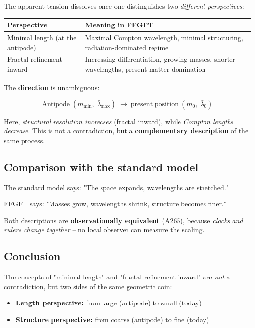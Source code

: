 The apparent tension dissolves once one distinguishes two
\emph{different perspectives}:

\begin{center}
	\small
	\begin{tabular}{p{}p{}}
		\toprule
		\textbf{Perspective} & \textbf{Meaning in FFGFT} \\
		\midrule
		Minimal length (at the antipode) & 
		Maximal Compton wavelength, minimal structuring,
		radiation-dominated regime \\
		Fractal refinement inward & 
		Increasing differentiation, growing masses,
		shorter wavelengths, present matter domination \\
		\bottomrule
	\end{tabular}
\end{center}

The \textbf{direction} is unambiguous:

\[
\text{Antipode} \;(m_\text{min},\; \bar\lambda_\text{max})
\;\longrightarrow\;
\text{present position} \;(m_0,\; \bar\lambda_0)
\]

Here, \emph{structural resolution increases} (fractal inward),
while \emph{Compton lengths decrease}. This is not a contradiction,
but a \textbf{complementary description} of the same process.

\subsection{Comparison with the standard model}

The standard model says:  
"The space expands, wavelengths are stretched."

FFGFT says:  
"Masses grow, wavelengths shrink, structure becomes finer."

Both descriptions are \textbf{observationally equivalent} (A265),
because \emph{clocks and rulers change together} -- no local
observer can measure the scaling.

\subsection{Conclusion}

The concepts of "minimal length" and "fractal refinement inward" are
\emph{not} a contradiction, but two sides of the same geometric coin:

\begin{itemize}[leftmargin=1.4em,itemsep=0.2em]
	\item \textbf{Length perspective:} from large (antipode) to small (today)
	\item \textbf{Structure perspective:} from coarse (antipode) to fine (today)
\end{itemize}

